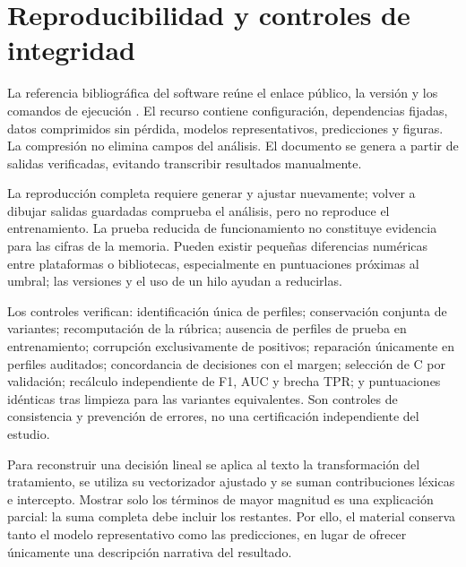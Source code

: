 \chapter{Reproducibilidad y controles de integridad}
La referencia bibliográfica del software reúne el enlace público, la versión y los comandos de ejecución \cite{repositorio2026}. El recurso contiene configuración, dependencias fijadas, datos comprimidos sin pérdida, modelos representativos, predicciones y figuras. La compresión no elimina campos del análisis. El documento se genera a partir de salidas verificadas, evitando transcribir resultados manualmente.

La reproducción completa requiere generar y ajustar nuevamente; volver a dibujar salidas guardadas comprueba el análisis, pero no reproduce el entrenamiento. La prueba reducida de funcionamiento no constituye evidencia para las cifras de la memoria. Pueden existir pequeñas diferencias numéricas entre plataformas o bibliotecas, especialmente en puntuaciones próximas al umbral; las versiones y el uso de un hilo ayudan a reducirlas.

Los controles verifican: identificación única de perfiles; conservación conjunta de variantes; recomputación de la rúbrica; ausencia de perfiles de prueba en entrenamiento; corrupción exclusivamente de positivos; reparación únicamente en perfiles auditados; concordancia de decisiones con el margen; selección de C por validación; recálculo independiente de F1, AUC y brecha TPR; y puntuaciones idénticas tras limpieza para las variantes equivalentes. Son controles de consistencia y prevención de errores, no una certificación independiente del estudio.

Para reconstruir una decisión lineal se aplica al texto la transformación del tratamiento, se utiliza su vectorizador ajustado y se suman contribuciones léxicas e intercepto. Mostrar solo los términos de mayor magnitud es una explicación parcial: la suma completa debe incluir los restantes. Por ello, el material conserva tanto el modelo representativo como las predicciones, en lugar de ofrecer únicamente una descripción narrativa del resultado.
